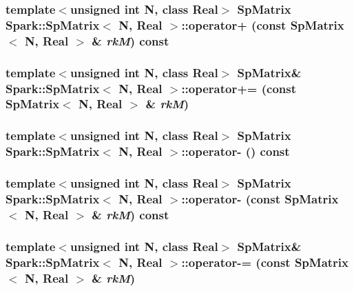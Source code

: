 \subsubsection{\setlength{\rightskip}{0pt plus 5cm}template$<$unsigned int N, class Real$>$ {\bf Sp\-Matrix} {\bf Spark::Sp\-Matrix}$<$ N, Real $>$::operator+ (const {\bf Sp\-Matrix}$<$ N, Real $>$ \& {\em rk\-M}) const}\label{classSpark_1_1SpMatrix_a20}


\subsubsection{\setlength{\rightskip}{0pt plus 5cm}template$<$unsigned int N, class Real$>$ {\bf Sp\-Matrix}\& {\bf Spark::Sp\-Matrix}$<$ N, Real $>$::operator+= (const {\bf Sp\-Matrix}$<$ N, Real $>$ \& {\em rk\-M})}\label{classSpark_1_1SpMatrix_a26}


\subsubsection{\setlength{\rightskip}{0pt plus 5cm}template$<$unsigned int N, class Real$>$ {\bf Sp\-Matrix} {\bf Spark::Sp\-Matrix}$<$ N, Real $>$::operator- () const}\label{classSpark_1_1SpMatrix_a25}


\subsubsection{\setlength{\rightskip}{0pt plus 5cm}template$<$unsigned int N, class Real$>$ {\bf Sp\-Matrix} {\bf Spark::Sp\-Matrix}$<$ N, Real $>$::operator- (const {\bf Sp\-Matrix}$<$ N, Real $>$ \& {\em rk\-M}) const}\label{classSpark_1_1SpMatrix_a21}


\subsubsection{\setlength{\rightskip}{0pt plus 5cm}template$<$unsigned int N, class Real$>$ {\bf Sp\-Matrix}\& {\bf Spark::Sp\-Matrix}$<$ N, Real $>$::operator-= (const {\bf Sp\-Matrix}$<$ N, Real $>$ \& {\em rk\-M})}\label{classSpark_1_1SpMatrix_a27}


